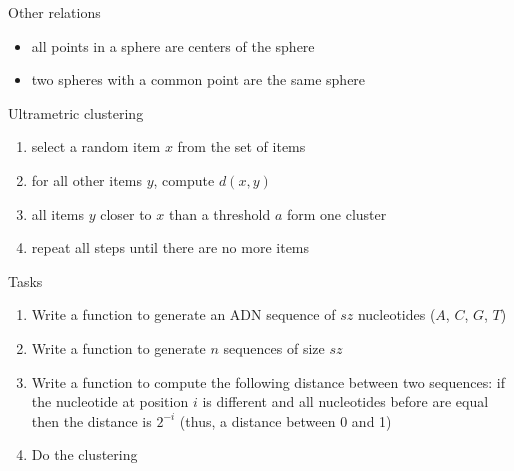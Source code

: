 \documentclass{beamer}
\begin{document}
\begin{frame}{Other relations}
  \begin{itemize}[<+->]
    \item all points in a sphere are centers of the sphere
    \item two spheres with a common point are the same sphere
  \end{itemize}
\end{frame}

\begin{frame}{Ultrametric clustering}
  \begin{enumerate}
    \item select a random item $x$ from the set of items
    \item for all other items $y$, compute $d(x, y)$
    \item all items $y$ closer to $x$ than a threshold $a$ form one cluster
    \item repeat all steps until there are no more items
  \end{enumerate}
\end{frame}

\begin{frame}{Tasks}
  \begin{enumerate}
    \item Write a function to generate an ADN sequence of $sz$ nucleotides
      ($A$, $C$, $G$, $T$)
    \item Write a function to generate $n$ sequences of size $sz$
    \item Write a function to compute the following distance between two
      sequences: if the nucleotide at position $i$ is different and all
      nucleotides before are equal then the distance is $2^{-i}$ (thus, a
      distance between 0 and 1)
    \item Do the clustering
  \end{enumerate}
\end{frame}
\end{document}
